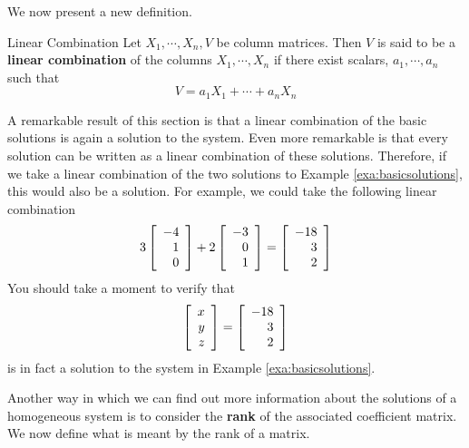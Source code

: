 We now present a new definition. 

\begin{definition}{Linear Combination}\label{def:linearcombination-columns}
Let $X_1,\cdots ,X_n,V$ be column matrices. Then 
$V$ is said to be a \textbf{linear combination }
of the columns $X_1,\cdots , X_n $ 
if there exist scalars, $a_{1},\cdots ,a_{n}$ such
that
\begin{equation*}
V = a_1 X_1 + \cdots + a_n X_n
\end{equation*}
\end{definition}

A remarkable result of this section is that a linear combination of the basic solutions is again a solution to the system.
Even more remarkable is that every solution can be written as a linear combination of these solutions. 
Therefore, if we take a linear combination of the two solutions to Example \ref{exa:basicsolutions},
this would also be a solution. 
For example, we could take the following linear combination
\begin{equation*}
3
\left[
\begin{array}{r}
-4 \\
1 \\
0
\end{array}
\right]
+
2
\left[
\begin{array}{r}
-3 \\
0\\
1
\end{array}
\right]
 =
\left[
\begin{array}{r}
-18 \\
3 \\
2
\end{array}
\right]
\end{equation*}
You should take a moment to verify that
\begin{equation*}
\left[
\begin{array}{r}
x \\
y \\
z
\end{array}
\right]
=
\left[
\begin{array}{r}
-18 \\
3 \\
2
\end{array}
\right]
\end{equation*}
is in fact a solution to the system in Example \ref{exa:basicsolutions}.

Another way in which we can find out more information about the solutions of 
a homogeneous system is to consider the \textbf{rank} of the associated coefficient matrix. We
now define what is meant by the rank of a matrix.

